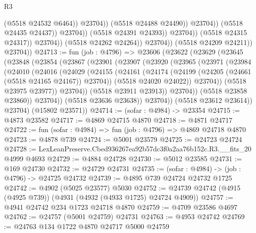 \begin{lexlean}{R3}
\begin{coremodule}
                                              (@5518 @24532 @6464))
                                            @23704))
                                        (@5518 @24488 @24490))
                                      @23704))
                                  (@5518 @24435 @24437))
                                @23704))
                            (@5518 @24391 @24393))
                          @23704))
                      (@5518 @24315 @24317))
                    @23704))
                (@5518 @24262 @24264))
              @23704))
          (@5518 @24209 @24211))
        @23704))
@24713 := fun (job : @4796) =>
  @23606
    (@23622
      (@23629
        (@23645
          (@23848
            (@23854
              (@23867
                (@23901
                  (@23907
                    (@23920
                      (@23965
                        (@23971
                          (@23984
                            (@24010
                              (@24016
                                (@24029
                                  (@24155
                                    (@24161
                                      (@24174
                                        (@24199 (@24205 (@24661 (@5518 @24165 @24167)) @23704))
                                        (@5518 @24020 @24022))
                                      @23704))
                                  (@5518 @23975 @23977))
                                @23704))
                            (@5518 @23911 @23913))
                          @23704))
                      (@5518 @23858 @23860))
                    @23704))
                (@5518 @23636 @23638))
              @23704))
          (@5518 @23612 @23614))
        @23704)
      (@15802 @23571))
@24714 := (sofar : @4984) -> @23354
@24715 := @4873 @23582
@24717 := @4869 @24715 @4870
@24718 := @4871 @24717
@24722 := fun (sofar : @4984) => fun (job : @4796) => @4869 @24718 @4870
@24723 := @4878 @739
@24724 := @5001 @23579
@24725 := @24723 @24724
@24728 := LexLeanPreserve.Cbed936267ea92b57dc3f0a2aa76b152c.R3.__fits_20 @4999 @4693
@24729 := @4884 @24728
@24730 := @5012 @23585
@24731 := @169 @24730
@24732 := @24729 @24731
@24735 := (sofar : @4984) -> (job : @4796) -> @24725 @24732
@24739 := @4895 @739 @24724 @24732 @1725
@24742 := @4902 (@5025 @23577) @5030
@24752 := @24739 @24742 (@4915 (@4925 @739)) (@4931 (@4932 (@4933 @1725) @24724 @4909))
@24757 := @4941 @24742 @234 @1723 @24718 @4870
@24759 := @4709 @23586 @4697
@24762 := @24757 (@5001 @24759) @24731
@24763 := @4953 @24742
@24769 := @24763 @134 @1722 @4870 @24717 @5000 @24759

\end{coremodule}
\end{lexlean}
